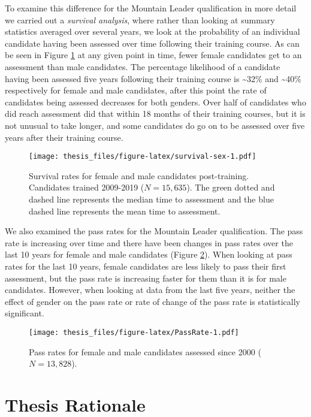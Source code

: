 \documentclass[
  12pt,
  a4paper,
]{book}
\begin{document}
To examine this difference for the Mountain Leader qualification in more detail we carried out a \emph{survival analysis}, where rather than looking at summary statistics averaged over several years, we look at the probability of an individual candidate having been assessed over time following their training course. As can be seen in Figure \ref{fig:survival-sex} at any given point in time, fewer female candidates get to an assessment than male candidates. The percentage likelihood of a candidate having been assessed five years following their training course is \textasciitilde32\% and \textasciitilde40\% respectively for female and male candidates, after this point the rate of candidates being assessed decreases for both genders. Over half of candidates who did reach assessment did that within 18 months of their training courses, but it is not unusual to take longer, and some candidates do go on to be assessed over five years after their training course.

\begin{figure}
\centering
\texttt{[image: thesis\_files/figure-latex/survival-sex-1.pdf]}
\caption{\label{fig:survival-sex}Survival rates for female and male candidates post-training. Candidates trained 2009-2019 (\(N = 15,635\)). The green dotted and dashed line represents the median time to assessment and the blue dashed line represents the mean time to assessment.}
\end{figure}

We also examined the pass rates for the Mountain Leader qualification. The pass rate is increasing over time and there have been changes in pass rates over the last 10 years for female and male candidates (Figure \ref{fig:PassRate}). When looking at pass rates for the last 10 years, female candidates are less likely to pass their first assessment, but the pass rate is increasing faster for them than it is for male candidates. However, when looking at data from the last five years, neither the effect of gender on the pass rate or rate of change of the pass rate is statistically significant.

\begin{figure}
\centering
\texttt{[image: thesis\_files/figure-latex/PassRate-1.pdf]}
\caption{\label{fig:PassRate}Pass rates for female and male candidates assessed since 2000 (\(N = 13,828\)).}
\end{figure}

\hypertarget{thesis-rationale}{%
\section{Thesis Rationale}\label{thesis-rationale}}
\end{document}
